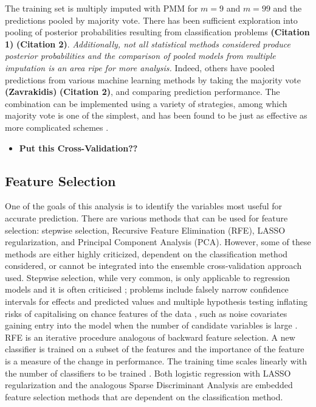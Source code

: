 \documentclass[12pt,]{article}
\providecommand{\tightlist}{%
  \setlength{\itemsep}{0pt}\setlength{\parskip}{0pt}}
\begin{document}
The training set is multiply imputed with PMM for \(m=9\) and \(m=99\)
and the predictions pooled by majority vote. There has been sufficient
exploration into pooling of posterior probabilities resulting from
classification problems \textbf{(Citation 1)} \textbf{(Citation 2)}.
\emph{Additionally, not all statistical methods considered produce
posterior probabilities and the comparison of pooled models from
multiple imputation is an area ripe for more analysis.} Indeed, others
have pooled predictions from various machine learning methods by taking
the majority vote \textbf{(Zavrakidis)} \textbf{(Citation 2)}, and
comparing prediction performance. The combination can be implemented
using a variety of strategies, among which majority vote is one of the
simplest, and has been found to be just as effective as more complicated
schemes \autocite{lam_optimal_1995}.

\begin{itemize}
\tightlist
\item
  \textbf{Put this Cross-Validation??}
\end{itemize}

\subsection{Feature Selection}\label{feature-selection}

One of the goals of this analysis is to identify the variables most
useful for accurate prediction. There are various methods that can be
used for feature selection: stepwise selection, Recursive Feature
Elimination (RFE), LASSO regularization, and Principal Component
Analysis (PCA). However, some of these methods are either highly
criticized, dependent on the classification method considered, or cannot
be integrated into the ensemble cross-validation approach used. Stepwise
selection, while very common, is only applicable to regression models
and it is often criticised \autocite{kemp_applied_2003}; problems
include falsely narrow confidence intervals for effects and predicted
values \autocite{altman_bootstrap_1989} and multiple hypothesis testing
inflating risks of capitalising on chance features of the data
\autocite{altman_practical_1991}, such as noise covariates gaining entry
into the model when the number of candidate variables is large
\autocite{derksen_backward_1992}. RFE is an iterative procedure
analogous of backward feature selection. A new classifier is trained on
a subset of the features and the importance of the feature is a measure
of the change in performance. The training time scales linearly with the
number of classifiers to be trained \autocite{guyon_gene_2002}. Both
logistic regression with LASSO regularization
\autocite{tibshirani_regression_1996} and the analogous Sparse
Discriminant Analysis \autocite{clemmensen_sparse_2011} are embedded
feature selection methods that are dependent on the classification
method.
\end{document}
